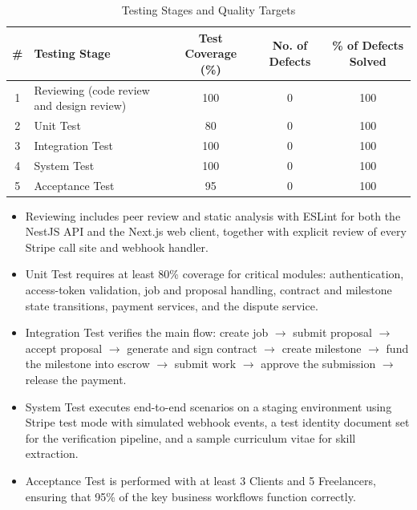 \begin{table}[H]
\centering
\caption{Testing Stages and Quality Targets}
\label{tab:testing-targets}
\small
\renewcommand{\arraystretch}{1.3}
\begin{tabular}{|c|>{\raggedright\arraybackslash}p{5.4cm}|c|c|c|}
\hline
\rowcolor{headerbg}
\textbf{\#} & \textbf{Testing Stage} & \textbf{Test Coverage (\%)} & \textbf{No. of Defects} & \textbf{\% of Defects Solved} \\
\hline
1 & Reviewing (code review and design review) & 100 & 0 & 100 \\
\hline
2 & Unit Test & 80 & 0 & 100 \\
\hline
3 & Integration Test & 100 & 0 & 100 \\
\hline
4 & System Test & 100 & 0 & 100 \\
\hline
5 & Acceptance Test & 95 & 0 & 100 \\
\hline
\end{tabular}
\end{table}

\begin{itemize}
    \item Reviewing includes peer review and static analysis with ESLint for both the NestJS API and the Next.js web client, together with explicit review of every Stripe call site and webhook handler.
    \item Unit Test requires at least 80\% coverage for critical modules: authentication, access-token validation, job and proposal handling, contract and milestone state transitions, payment services, and the dispute service.
    \item Integration Test verifies the main flow: create job $\rightarrow$ submit proposal $\rightarrow$ accept proposal $\rightarrow$ generate and sign contract $\rightarrow$ create milestone $\rightarrow$ fund the milestone into escrow $\rightarrow$ submit work $\rightarrow$ approve the submission $\rightarrow$ release the payment.
    \item System Test executes end-to-end scenarios on a staging environment using Stripe test mode with simulated webhook events, a test identity document set for the verification pipeline, and a sample curriculum vitae for skill extraction.
    \item Acceptance Test is performed with at least 3 Clients and 5 Freelancers, ensuring that 95\% of the key business workflows function correctly.
\end{itemize}
